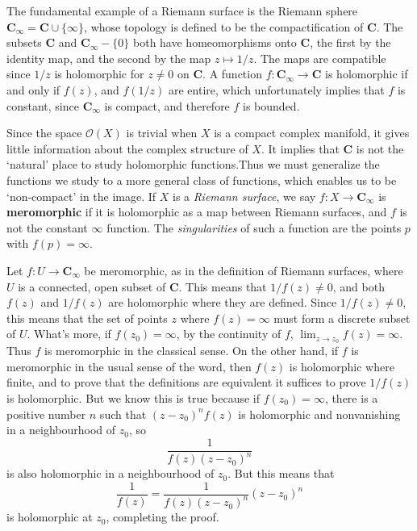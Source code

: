 \begin{example}
    The fundamental example of a Riemann surface is the Riemann sphere $\mathbf{C}_\infty = \mathbf{C} \cup \{ \infty \}$, whose topology is defined to be the compactification of $\mathbf{C}$. The subsets $\mathbf{C}$ and $\mathbf{C}_\infty - \{ 0 \}$ both have homeomorphisms onto $\mathbf{C}$, the first by the identity map, and the second by the map $z \mapsto 1/z$. The maps are compatible since $1/z$ is holomorphic for $z \neq 0$ on $\mathbf{C}$. A function $f: \mathbf{C}_\infty \to \mathbf{C}$ is holomorphic if and only if $f(z)$, and $f(1/z)$ are entire, which unfortunately implies that $f$ is constant, since $\mathbf{C}_\infty$ is compact, and therefore $f$ is bounded.
\end{example}

Since the space $\mathcal{O}(X)$ is trivial when $X$ is a compact complex manifold, it gives little information about the complex structure of $X$. It implies that $\mathbf{C}$ is not the `natural' place to study holomorphic functions.Thus we must generalize the functions we study to a more general class of functions, which enables us to be `non-compact' in the image. If $X$ is a {\it Riemann surface}, we say $f: X \to \mathbf{C}_\infty$ is {\bf meromorphic} if it is holomorphic as a map between Riemann surfaces, and $f$ is not the constant $\infty$ function. The {\it singularities} of such a function are the points $p$ with $f(p) = \infty$.

\begin{example}
    Let $f: U \to \mathbf{C}_\infty$ be meromorphic, as in the definition of Riemann surfaces, where $U$ is a connected, open subset of $\mathbf{C}$. This means that $1/f(z) \neq 0$, and both $f(z)$ and $1/f(z)$ are holomorphic where they are defined. Since $1/f(z) \neq 0$, this means that the set of points $z$ where $f(z) = \infty$ must form a discrete subset of $U$. What's more, if $f(z_0) = \infty$, by the continuity of $f$, $\lim_{z \to z_0} f(z) = \infty$. Thus $f$ is meromorphic in the classical sense. On the other hand, if $f$ is meromorphic in the usual sense of the word, then $f(z)$ is holomorphic where finite, and to prove that the definitions are equivalent it suffices to prove $1/f(z)$ is holomorphic. But we know this is true because if $f(z_0) = \infty$, there is a positive number $n$ such that $(z - z_0)^n f(z)$ is holomorphic and nonvanishing in a neighbourhood of $z_0$, so
    \[ \frac{1}{f(z) (z - z_0)^n} \]
    is also holomorphic in a neighbourhood of $z_0$. But this means that
    \[ \frac{1}{f(z)} = \frac{1}{f(z) (z - z_0)^n} (z - z_0)^n \]
    is holomorphic at $z_0$, completing the proof.
\end{example}


